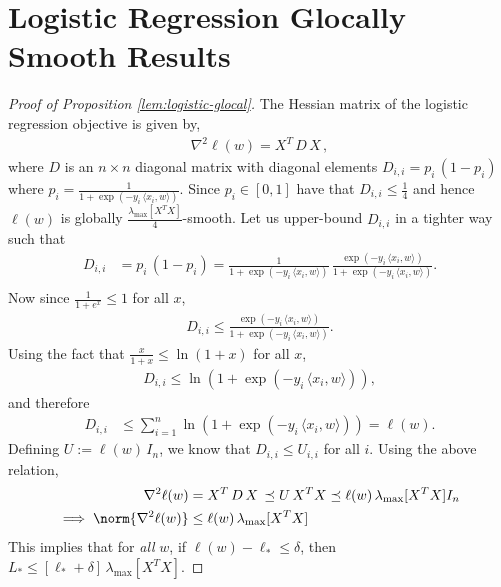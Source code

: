\documentclass[10pt]{article} %
\begin{document}
\section{Logistic Regression Glocally Smooth Results}\label{lr-glocal-proof}
\begin{proof}[Proof of Proposition \ref{lem:logistic-glocal}]    
The Hessian matrix of the logistic regression objective is given by,
\begin{align*}
\nabla^2 \ell(w) = X^T \, D \, X  \,,
\end{align*}
where $D$ is an $n \times n$ diagonal matrix with diagonal elements $D_{i,i} = p_i \, (1 - p_i)$ where $p_i = \frac{1}{1 + \exp(-y_i \, \langle x_i, w \rangle)}$. Since $p_i \in [0,1]$ have that $D_{i,i} \leq \frac{1}{4}$ and hence $\ell(w)$ is globally $\frac{\lambda_{\max}[X^TX]}{4}$-smooth. Let us upper-bound $D_{i,i}$ in a tighter way such that
\begin{align*}
D_{i,i} & = p_i \, (1- p_i) = \frac{1}{1 + \exp(-y_i \, \langle x_i, w \rangle)} \, \frac{\exp(-y_i \, \langle x_i, w \rangle)}{1 + \exp(-y_i \, \langle x_i, w \rangle)}.  \\
\end{align*}
Now since $\frac{1}{1 + e^x} \leq 1$ for all $x$,
\begin{align*}
D_{i,i} \leq \frac{\exp(-y_i \, \langle x_i, w \rangle)}{1 + \exp(-y_i \, \langle x_i, w \rangle)}.
\end{align*}
Using the fact that $\frac{x}{1+x} \leq \ln(1+x)$ for all $x$,
\begin{align*}
D_{i,i} \leq \ln\left(1 + \exp(-y_i \, \langle x_i, w \rangle)\right),
\end{align*}
and therefore
\begin{align*}
    D_{i,i} & \leq \sum_{i = 1}^{n} \ln\left(1 + \exp(-y_i \, \langle x_i, w \rangle) \right) = \ell(w) .
\end{align*}
Defining $U := \ell(w) \, I_n$, we know that $D_{i,i} \leq U_{i,i}$ for all $i$. Using the above relation,
\begin{align*}
\nabla^2 \ell(w) & = X^T \, D \, X  \, \preceq U \, X^T X \preceq \ell(w) \, \lambda_{\max}[X^T X] I_n \\
\implies \norm{\nabla^2 \ell(w)} &\leq \ell(w) \, \lambda_{\max}[X^T X]
\end{align*}
This implies that for \textit{all} $w$, if $\ell(w) - \ell_{*} \leq \delta$, then $L_{*} \leq [\ell_{*} + \delta] \, \lambda_{\max}[X^T X]$. 


\end{proof}
\end{document}
